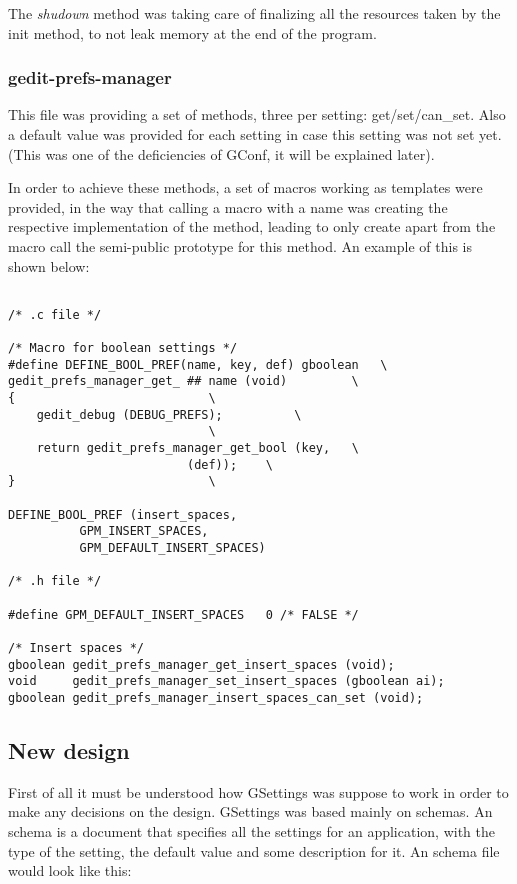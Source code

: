 The \emph{shudown} method was taking care of finalizing all the resources taken by the init method, to not leak memory at the end of the program.

\subsubsection*{gedit-prefs-manager}

This file was providing a set of methods, three per setting: get/set/can\_set. Also a default value was provided for each setting in case this setting was not set yet. (This was one of the deficiencies of GConf, it will be explained later).

In order to achieve these methods, a set of macros working as templates were provided, in the way that calling a macro with a name was creating the respective implementation of the method, leading to only create apart from the macro call the semi-public prototype for this method. An example of this is shown below:

\begin{lstlisting}[style=GObject]

/* .c file */

/* Macro for boolean settings */
#define DEFINE_BOOL_PREF(name, key, def) gboolean 	\
gedit_prefs_manager_get_ ## name (void)			\
{							\
	gedit_debug (DEBUG_PREFS);			\
							\
	return gedit_prefs_manager_get_bool (key,	\
					     (def));	\
}							\

DEFINE_BOOL_PREF (insert_spaces,
		  GPM_INSERT_SPACES,
		  GPM_DEFAULT_INSERT_SPACES)

/* .h file */

#define GPM_DEFAULT_INSERT_SPACES	0 /* FALSE */

/* Insert spaces */
gboolean gedit_prefs_manager_get_insert_spaces (void);
void	 gedit_prefs_manager_set_insert_spaces (gboolean ai);
gboolean gedit_prefs_manager_insert_spaces_can_set (void);

\end{lstlisting}

\subsection{New design}

First of all it must be understood how GSettings was suppose to work in order to make any decisions on the design. GSettings was based mainly on schemas. An schema is a document that specifies all the settings for an application, with the type of the setting, the default value and some description for it. An schema file would look like this:

